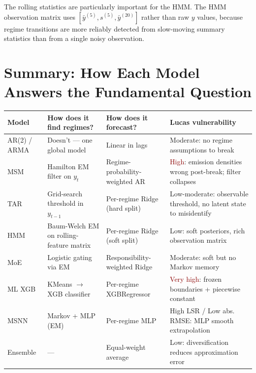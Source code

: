 \documentclass[11pt, a4paper]{article}
\begin{document}
The rolling statistics are particularly important for the HMM. The HMM
observation matrix uses $[\bar{y}^{(5)}, s^{(5)}, \bar{y}^{(20)}]$ rather
than raw $y$ values, because regime transitions are more reliably detected from
slow-moving summary statistics than from a single noisy observation.

\section{Summary: How Each Model Answers the Fundamental Question}

\begin{center}
\small
\begin{tabular}{p{2.5cm}p{3.5cm}p{3.5cm}p{3.5cm}}
  \toprule
  \textbf{Model} & \textbf{How does it find regimes?} & \textbf{How does it forecast?} & \textbf{Lucas vulnerability} \\
  \midrule
  AR(2) / ARMA & Doesn't --- one global model & Linear in lags & Moderate: no regime assumptions to break \\
  \addlinespace
  MSM & Hamilton EM filter on $y_t$ & Regime-probability-weighted AR & \textcolor{darkred}{High}: emission densities wrong post-break; filter collapses \\
  \addlinespace
  TAR & Grid-search threshold in $y_{t-1}$ & Per-regime Ridge (hard split) & Low-moderate: observable threshold, no latent state to misidentify \\
  \addlinespace
  HMM & Baum-Welch EM on rolling-feature matrix & Per-regime Ridge (soft split) & \textcolor{mygreen}{Low}: soft posteriors, rich observation matrix \\
  \addlinespace
  MoE & Logistic gating via EM & Responsibility-weighted Ridge & Moderate: soft but no Markov memory \\
  \addlinespace
  ML XGB & KMeans $\to$ XGB classifier & Per-regime XGBRegressor & \textcolor{darkred}{Very high}: frozen boundaries + piecewise constant \\
  \addlinespace
  MSNN & Markov + MLP (EM) & Per-regime MLP & High LSR / \textcolor{mygreen}{Low abs. RMSE}: MLP smooth extrapolation \\
  \addlinespace
  Ensemble & --- & Equal-weight average & Low: diversification reduces approximation error \\
  \bottomrule
\end{tabular}
\end{center}
\end{document}
